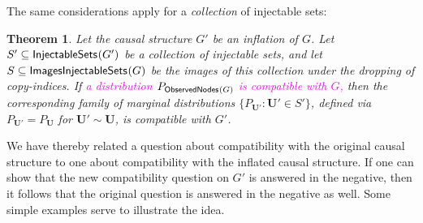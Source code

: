 \documentclass[aps,english,10pt,superscriptaddress,onecolumn,twoside,longbibliography,pra,floatfix,fleqn,nofootinbib]{revtex4-1}
\newtheorem{theorem}{Theorem}
\newtheorem{lemma}[theorem]{Lemma}
\theoremstyle{definition}
\newcounter{example}[section]
\newcommand{\SmallNamedFunction}[3][]{\operatorname{\mathsf{#2}}_{#1}\parenths{#3}}
\newcommand{\obsnodes}[1]{\SmallNamedFunction{ObservedNodes}{#1}}
\DeclarePairedDelimiter{\parenths}{\lparen}{\rparen}
\newcommand{\elie}[1]{\textcolor{Fuchsia}{#1}}
\begin{document}
The same considerations apply for a {\em collection} of injectable sets:

\begin{theorem} \label{mainlemma}
Let the causal structure $G'$ be an inflation of $G$. 
Let $S'  \subseteq \SmallNamedFunction{InjectableSets}{G'}$ be a collection of injectable sets, and let $S \subseteq \SmallNamedFunction{ImagesInjectableSets}{G}$ be the images of this collection under the dropping of copy-indices. If 
\elie{a distribution $P_{\obsnodes{G}}$ is compatible with $G$, }
then the corresponding family of marginal distributions $\{ P_{\bm{U}'} : \bm{U}' \in S' \}$, defined via $P_{\bm{U}'}= P_{\bm{U}}$ for $\bm{U}' \sim \bm{U}$, is compatible with $G'$.
\end{theorem}

We have thereby related a question about compatibility with the original causal structure to one about compatibility with the inflated causal structure.  If one can show that the new compatibility question on $G'$ is answered in the negative, then it follows that the original question is answered in the negative as well.    Some simple examples serve to illustrate the idea.
\end{document}
